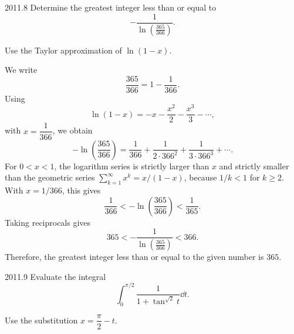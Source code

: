     \begin{pastproblem}{2011.8}
        Determine the greatest integer less than or equal to
        \[
            -\frac{1}{\ln\left(\frac{365}{366}\right)}.
        \]

        \begin{hint}
            Use the Taylor approximation of $\ln(1-x)$.
        \end{hint}
    \end{pastproblem}

    \begin{solution}
        We write
        \[
            \frac{365}{366}=1-\frac{1}{366}.
        \]
        Using
        \[
            \ln(1-x)
            =
            -x-\frac{x^2}{2}-\frac{x^3}{3}-\cdots,
        \]
        with $x=\dfrac{1}{366}$, we obtain
        \[
            -\ln\left(\frac{365}{366}\right)
            =
            \frac{1}{366}
            +
            \frac{1}{2\cdot 366^2}
            +
            \frac{1}{3\cdot 366^3}
            +
            \cdots.
        \]
        For $0<x<1$, the logarithm series is strictly larger than $x$ and
        strictly smaller than the geometric series
        $\sum_{k=1}^{\infty}x^k=x/(1-x)$, because $1/k<1$ for $k\geq2$.
        With $x=1/366$, this gives
        \[
            \frac{1}{366}
            <
            -\ln\left(\frac{365}{366}\right)
            <
            \frac{1}{365}.
        \]
        Taking reciprocals gives
        \[
            365
            <
            -\frac{1}{\ln\left(\frac{365}{366}\right)}
            <
            366.
        \]
        Therefore, the greatest integer less than or equal to the given number is $\boxed{365}$.
    \end{solution}

    \begin{pastproblem}{2011.9}
        Evaluate the integral
        \[
            \int_0^{\pi/2}
            \frac{1}{1+\tan^{\sqrt{2}}t}\dd t.
        \]

        \begin{hint}
            Use the substitution $x=\dfrac{\pi}{2}-t$.
        \end{hint}
    \end{pastproblem}

